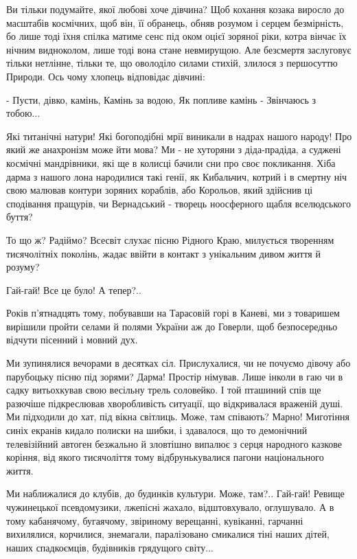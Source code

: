 Ви тільки подумайте, якої любові хоче дівчина? Щоб кохання козака виросло до
масштабів космічних, щоб він, її обранець, обняв розумом і серцем безмірність,
бо лише тоді їхня спілка матиме сенс під оком оцієї зоряної ріки, котра вінчає
їх нічним видноколом, лише тоді вона стане невмирущою. Але безсмертя заслуговує
тільки нетлінне, тільки те, що оволоділо силами стихій, злилося з першосуттю
Природи. Ось чому хлопець відповідає дівчині:

- Пусти, дівко, камінь,
Камінь за водою,
Як попливе камінь -
Звінчаюсь з тобою...

Які титанічні натури! Які богоподібні мрії виникали в надрах нашого народу! Про
який же анахронізм може йти мова? Ми - не хуторяни з діда-прадіда, а суджені
космічні мандрівники, які ще в колисці бачили сни про своє покликання. Хіба
дарма з нашого лона народилися такі генії, як Кибальчич, котрий і в смертну ніч
свою малював контури зоряних кораблів, або Корольов, який здійснив ці
сподівання пращурів, чи Вернадський - творець ноосферного щабля вселюдського
буття?

То що ж? Радіймо? Всесвіт слухає пісню Рідного Краю, милується творенням
тисячолітніх поколінь, жадає ввійти в контакт з унікальним дивом життя й
розуму?

Гай-гай! Все це було! А тепер?..

Років п'ятнадцять тому, побувавши на Тарасовій горі в Каневі, ми з товаришем
вирішили пройти селами й полями України аж до Говерли, щоб безпосередньо
відчути пісенний і мовний дух.

Ми зупинялися вечорами в десятках сіл. Прислухалися, чи не почуємо дівочу або
парубоцьку пісню під зорями? Дарма! Простір німував. Лише інколи в гаю чи в
садку витьохкував свою весільну трель соловейко. І той пташиний спів ще
разючіше підкреслював хворобливість ситуації, що відкривалася враженій душі. Ми
підходили до хат, під вікна світлиць. Може, там співають? Марно! Миготіння
синіх екранів кидало полиски на шибки, і здавалося, що то демонічний
телевізійний автоген безжально й зловтішно випалює з серця народного казкове
коріння, від якого тисячоліття тому відбрунькувалися пагони національного
життя.

Ми наближалися до клубів, до будинків культури. Може, там?.. Гай-гай! Ревище
чужинецької псевдомузики, лжепісні жахало, відштовхувало, оглушувало. А в тому
кабанячому, бугаячому, звіриному верещанні, кувіканні, гарчанні вихилялися,
корчилися, знемагали, паралізовано смикалися тіні наших дітей, наших
спадкоємців, будівників грядущого світу...

